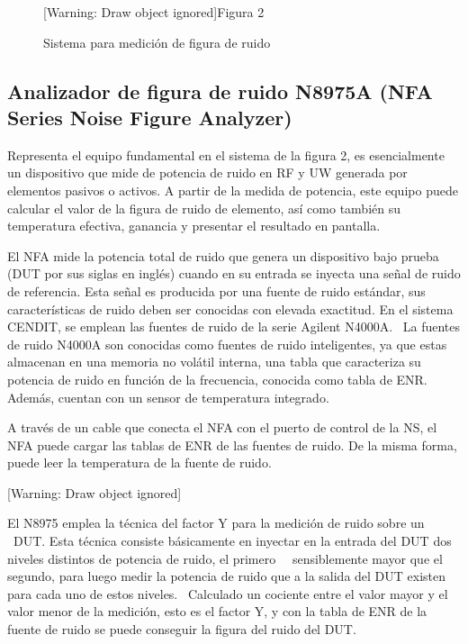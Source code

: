 \documentclass[paper=letter,oneside,fontsize=10pt,parskip=full]{article}
\begin{document}
\bigskip



\begin{figure}
\centering
\begin{minipage}{18.516cm}
[Warning: Draw object ignored]Figura 2

Sistema para medición de figura de ruido
\end{minipage}
\end{figure}
\subsection[Analizador de figura de ruido N8975A (NFA Series Noise Figure Analyzer)]{Analizador de figura de ruido
N8975A (NFA Series Noise Figure Analyzer)}
Representa el equipo fundamental en el sistema de la figura 2, es esencialmente un dispositivo que mide de potencia de
ruido en RF y UW generada por elementos pasivos o activos. A partir de la medida de potencia, este equipo puede
calcular el valor de la figura de ruido de elemento, así como también su temperatura efectiva, ganancia y presentar el
resultado en pantalla. 

El NFA mide la potencia total de ruido que genera un dispositivo bajo prueba (DUT por sus siglas en inglés) cuando en su
entrada se inyecta una señal de ruido de referencia. Esta señal es producida por una fuente de ruido estándar, sus
características de ruido deben ser conocidas con elevada exactitud. En el sistema CENDIT, se emplean las fuentes de
ruido de la serie Agilent N4000A. \ La fuentes de ruido N4000A son conocidas como fuentes de ruido inteligentes, ya que
estas almacenan en una memoria no volátil interna, una tabla que caracteriza su potencia de ruido en función de la
frecuencia, conocida como tabla de ENR. Además, cuentan con un sensor de temperatura integrado.

A través de un cable que conecta el NFA con el puerto de control de la NS, el NFA puede cargar las tablas de ENR de las
fuentes de ruido. De la misma forma, puede leer la temperatura de la fuente de ruido.

[Warning: Draw object ignored]

El N8975 emplea la técnica del factor Y para la medición de ruido sobre un \ DUT. Esta técnica consiste básicamente en
inyectar en la entrada del DUT dos niveles distintos de potencia de ruido, el primero \ \ sensiblemente mayor que el
segundo, para luego medir la potencia de ruido que a la salida del DUT existen para cada uno de estos niveles.
\ Calculado un cociente entre el valor mayor y el valor menor de la medición, esto es el factor Y, y con la tabla de
ENR de la fuente de ruido se puede conseguir la figura del ruido del DUT.
\end{document}
